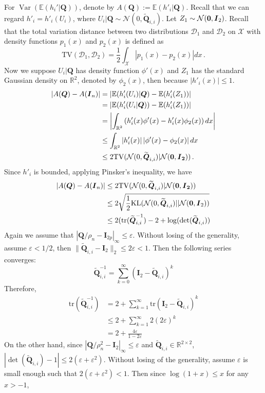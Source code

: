 \documentclass[11pt]{article}
\DeclareMathOperator{\Var}{Var}
\newcommand{\bI}{\boldsymbol{I}}
\newcommand{\bQ}{\boldsymbol{Q}}
\newcommand{\mbR}{\mathbb{R}}
\newcommand{\mcN}{\mathcal{N}}
\newcommand{\Expected}{\mathbb{E}}
\begin{document}
For $\Var(\Expected(h_i'|\bQ))$, denote by $A(\bQ):= \Expected(h'_i|\bQ)$. Recall that we can regard $h'_i = h'_i(U_i)$, where $U_i|\bQ \sim \mcN\left(0,\widetilde{\bQ}_{i,i}\right)$. Let $Z_1\sim\mcN({{\bf{0}}},\bI_2)$. 
Recall that the total variation distance between two distributions $\mathcal{D}_1$ and $\mathcal{D}_2$ on $\mathcal X$ with density functions $p_1(x)$ and $p_2(x)$ is defined as
\[
\mbox{TV}(\mathcal{D}_1,\mathcal{D}_2) = \frac{1}{2}\int_{\mathcal X}|p_1(x)-p_2(x)|dx\,.
\]
Now we suppose $U_i|\bQ$ has density function $\phi'(x)$ and $Z_1$ has the standard Gaussian density on $\mbR^2$, denoted by $\phi_2(x)$, then because $|h'_i(x)|\le 1$.
\begin{align*}
    |A(\bQ)-A(\bI_n)|&=|\Expected(h'_i(U_i)|\bQ)-\Expected(h'_i(Z_1))|\\
        &=|\Expected(h'_i(U_i|\bQ))-\Expected(h'_i(Z_1))|\\
        &=\left|\int_{\mbR^2}\left(h'_i(x)\phi'(x)-h'_i(x)\phi_2(x)\right)dx\right|\\
        &\le  \int_{\mbR^2}|h'_i(x)|\left|\phi'(x)-\phi_2(x)\right|dx\\
        &\le  2\mbox{TV}(\mcN(0,\widetilde{\bQ}_{i,i})|\mcN(\bf{0},\bI_2))\,.
\end{align*}
Since $h'_i$ is bounded, applying Pinsker's inequality, we have 
\begin{align*}
    |A(\bQ)-A(\bI_n)|  &\le  2\mbox{TV}(\mcN(0,\widetilde{\bQ}_{i,i})|\mcN(\bf{0},\bI_2))\\
        &\le 2\sqrt{\frac{1}{2}\mbox{KL}(\mcN(0,\widetilde{\bQ}_{i,i})||\mcN({{\bf{0}}},\bI_2))}\\
        &\le 2(\mbox{tr}(\widetilde{\bQ}_{i,i}^{-1})-2+\log(\det(\widetilde{\bQ}_{i,i}))
\end{align*}
Again we assume that $|\bQ/\rho_n-\bI_{2p}|_\infty \le \varepsilon$. Without losing of the generality, assume $\varepsilon<1/2$, then $\|\widetilde{\bQ}_{i,i}-\bI_2\|_2\le 2\varepsilon<1$. Then the following series converges:
\[
\widetilde{\bQ}_{i,i}^{-1} = \sum_{k=0}^\infty (\bI_2 - \widetilde{\bQ}_{i,i})^k
\]
Therefore, 
\begin{align}\label{eq:total-cov-2.1}
    \mbox{tr}(\widetilde{\bQ}_{i,i}^{-1}) &= 2+\sum_{k=1}^\infty\mbox{tr}(\bI_2 - \widetilde{\bQ}_{i,i})^k\nonumber\\
    &\le 2+ \sum_{k=1}^\infty2(2\varepsilon)^k\nonumber\\
    &=  2+\frac{4\varepsilon}{1-2\varepsilon}
\end{align}
On the other hand, since $|\bQ/\rho_n^2-\bI_2|_\infty\le \varepsilon$ and $\widetilde{\bQ}_{i,i}\in\mbR^{2\times 2}$, $|\det(\widetilde{\bQ}_{i,i})-1|\leq 2(\varepsilon+\varepsilon^2)$. Without losing of the generality, assume $\varepsilon$ is small enough such that $2(\varepsilon+\varepsilon^2)<1$. Then since $\log(1+x)\le x$ for any $x>-1$, 
\end{document}
